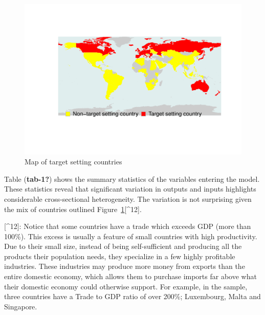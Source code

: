 \documentclass[
  letterpaper,
  DIV=11,
  numbers=noendperiod]{scrartcl}
\begin{document}
\begin{figure}[H]

{\centering \includegraphics{EE_R-R_files/figure-pdf/fig-map-1.pdf}

}

\caption{\label{fig-map}Map of target setting countries}

\end{figure}

Table (\textbf{tab-1?}) shows the summary statistics of the variables
entering the model. These statistics reveal that significant variation
in outputs and inputs highlights considerable cross-sectional
heterogeneity. The variation is not surprising given the mix of
countries outlined Figure~\ref{fig-map}{[}\^{}12{]}.

{[}\^{}12{]}: Notice that some countries have a trade which exceeds GDP
(more than 100\%). This excess is usually a feature of small countries
with high productivity. Due to their small size, instead of being
self-sufficient and producing all the products their population needs,
they specialize in a few highly profitable industries. These industries
may produce more money from exports than the entire domestic economy,
which allows them to purchase imports far above what their domestic
economy could otherwise support. For example, in the sample, three
countries have a Trade to GDP ratio of over 200\%; Luxembourg, Malta and
Singapore.
\end{document}
